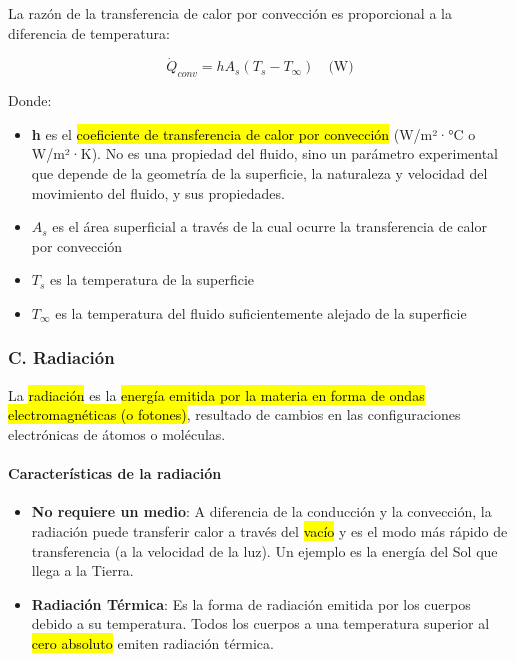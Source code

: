 \documentclass{article}
\begin{document}
    La razón de la transferencia de calor por convección es proporcional a la diferencia de temperatura:

    \begin{equation}
    \dot{Q}_{conv} = h A_s (T_s - T_\infty) \quad \text{(W)}
    \end{equation}

    Donde:
    \begin{itemize}
        \item \textbf{h} es el \hl{coeficiente de transferencia de calor por convección} (W/m²·°C o W/m²·K). No es una propiedad del fluido, sino un parámetro experimental que depende de la geometría de la superficie, la naturaleza y velocidad del movimiento del fluido, y sus propiedades.
        \item $A_s$ es el área superficial a través de la cual ocurre la transferencia de calor por convección
        \item $T_s$ es la temperatura de la superficie
        \item $T_\infty$ es la temperatura del fluido suficientemente alejado de la superficie
    \end{itemize}

    \subsubsection{C. Radiación}

    La \hl{radiación} es la \hl{energía emitida por la materia en forma de ondas electromagnéticas (o fotones)}, resultado de cambios en las configuraciones electrónicas de átomos o moléculas.

    \paragraph{Características de la radiación}

    \begin{itemize}
        \item \textbf{No requiere un medio}: A diferencia de la conducción y la convección, la radiación puede transferir calor a través del \hl{vacío} y es el modo más rápido de transferencia (a la velocidad de la luz). Un ejemplo es la energía del Sol que llega a la Tierra.
        
        \item \textbf{Radiación Térmica}: Es la forma de radiación emitida por los cuerpos debido a su temperatura. Todos los cuerpos a una temperatura superior al \hl{cero absoluto} emiten radiación térmica.
    \end{itemize}
\end{document}
